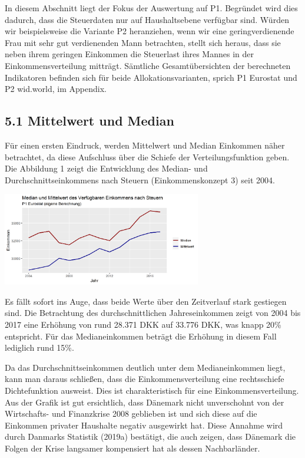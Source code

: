 \documentclass[12pt,]{article}
\let\origfigure\figure
\let\endorigfigure\endfigure
\renewenvironment{figure}[1][2] {
        \expandafter\origfigure\expandafter[H]
      } {\endorigfigure}
\begin{document}
In diesem Abschnitt liegt der Fokus der Auswertung auf P1. Begründet
wird dies dadurch, dass die Steuerdaten nur auf Haushaltsebene verfügbar
sind. Würden wir beispielsweise die Variante P2 heranziehen, wenn wir
eine geringverdienende Frau mit sehr gut verdienenden Mann betrachten,
stellt sich heraus, dass sie neben ihrem geringen Einkommen die
Steuerlast ihres Mannes in der Einkommensverteilung mitträgt. Sämtliche
Gesamtübersichten der berechneten Indikatoren befinden sich für beide
Allokationsvarianten, sprich P1 Eurostat und P2 wid.world, im Appendix.

\subsection{5.1 Mittelwert und Median}\label{mittelwert-und-median}

Für einen ersten Eindruck, werden Mittelwert und Median Einkommen näher
betrachtet, da diese Aufschluss über die Schiefe der Verteilungsfunktion
geben. Die Abbildung 1 zeigt die Entwicklung des Median- und
Durchschnittseinkommens nach Steuern (Einkommenskonzept 3) seit 2004.

\begin{figure}
\centering
\includegraphics[width=0.65000\textwidth]{img/medmit.png}
\caption{Median und Mittelwert, 2004-2017}
\end{figure}

Es fällt sofort ins Auge, dass beide Werte über den Zeitverlauf stark
gestiegen sind. Die Betrachtung des durchschnittlichen Jahreseinkommen
zeigt von 2004 bis 2017 eine Erhöhung von rund 28.371 DKK auf 33.776
DKK, was knapp 20\% entspricht. Für das Medianeinkommen beträgt die
Erhöhung in diesem Fall lediglich rund 15\%.

Da das Durchschnittseinkommen deutlich unter dem Medianeinkommen liegt,
kann man daraus schließen, dass die Einkommensverteilung eine
rechtsschiefe Dichtefunktion ausweist. Dies ist charakteristisch für
eine Einkommensverteilung. Aus der Grafik ist gut ersichtlich, dass
Dänemark nicht unverschohnt von der Wirtschafts- und Finanzkrise 2008
geblieben ist und sich diese auf die Einkommen privater Haushalte
negativ ausgewirkt hat. Diese Annahme wird durch Danmarks Statistik
(2019a) bestätigt, die auch zeigen, dass Dänemark die Folgen der Krise
langsamer kompensiert hat als dessen Nachbarländer.
\end{document}
